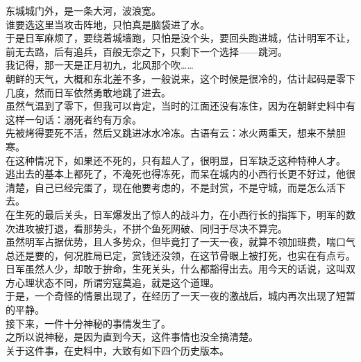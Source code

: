\begin{multicols}{\theparacolNo}
东城城门外，是一条大河，波浪宽。\\

谁要选这里当攻击阵地，只怕真是脑袋进了水。\\

于是日军麻烦了，要绕着城墙跑，只怕是没个头，要回头跑进城，估计明军不让，前无去路，后有追兵，百般无奈之下，只剩下一个选择——跳河。\\

我记得，那一天是正月初九，北风那个吹……\\

朝鲜的天气，大概和东北差不多，一般说来，这个时候是很冷的，估计起码是零下几度，然而日军依然勇敢地跳了进去。\\

虽然气温到了零下，但我可以肯定，当时的江面还没有冻住，因为在朝鲜史料中有这样一句话：溺死者约有万余。\\

先被烤得要死不活，然后又跳进冰水冷冻。古语有云：冰火两重天，想来不禁胆寒。\\

在这种情况下，如果还不死的，只有超人了，很明显，日军缺乏这种特种人才。\\

逃出去的基本上都死了，不淹死也得冻死，而呆在城内的小西行长更不好过，他很清楚，自己已经完蛋了，现在他要考虑的，不是封赏，不是守城，而是怎么活下去。\\

在生死的最后关头，日军爆发出了惊人的战斗力，在小西行长的指挥下，明军的数次进攻被打退，看那势头，不拼个鱼死网破、同归于尽决不算完。\\

虽然明军占据优势，且人多势众，但毕竟打了一天一夜，就算不领加班费，喘口气总还是要的，何况胜局已定，赏钱还没领，在这节骨眼上被打死，也实在有点亏。\\

日军虽然人少，却敢于拚命，生死关头，什么都豁得出去。用今天的话说，这叫双方心理状态不同，所谓穷寇莫追，就是这个道理。\\

于是，一个奇怪的情景出现了，在经历了一天一夜的激战后，城内再次出现了短暂的平静。\\

接下来，一件十分神秘的事情发生了。\\

之所以说神秘，是因为直到今天，这件事情也没全搞清楚。\\

关于这件事，在史料中，大致有如下四个历史版本。\\


\end{multicols}
